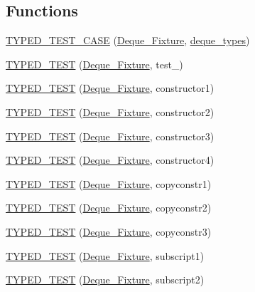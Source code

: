 \subsection*{Functions}
\begin{DoxyCompactItemize}
\item 
\hyperlink{TestDeque_8c_09_09_a79c5f0d583b012a972111954cd22db81}{T\-Y\-P\-E\-D\-\_\-\-T\-E\-S\-T\-\_\-\-C\-A\-S\-E} (\hyperlink{structDeque__Fixture}{Deque\-\_\-\-Fixture}, \hyperlink{TestDeque_8c_09_09_ad1999e4b3126317baa06a1266daa323c}{deque\-\_\-types})
\item 
\hyperlink{TestDeque_8c_09_09_a2729a50d5ca3edae9f1725a4263c7270}{T\-Y\-P\-E\-D\-\_\-\-T\-E\-S\-T} (\hyperlink{structDeque__Fixture}{Deque\-\_\-\-Fixture}, test\-\_)
\item 
\hyperlink{TestDeque_8c_09_09_a26339ed26d7eb2947b2be93dcb24d176}{T\-Y\-P\-E\-D\-\_\-\-T\-E\-S\-T} (\hyperlink{structDeque__Fixture}{Deque\-\_\-\-Fixture}, constructor1)
\item 
\hyperlink{TestDeque_8c_09_09_aa7bd41496de6d96a05b95de28e9dbbc1}{T\-Y\-P\-E\-D\-\_\-\-T\-E\-S\-T} (\hyperlink{structDeque__Fixture}{Deque\-\_\-\-Fixture}, constructor2)
\item 
\hyperlink{TestDeque_8c_09_09_a15aad0122e5f1338270ab7ab89f4c25b}{T\-Y\-P\-E\-D\-\_\-\-T\-E\-S\-T} (\hyperlink{structDeque__Fixture}{Deque\-\_\-\-Fixture}, constructor3)
\item 
\hyperlink{TestDeque_8c_09_09_aecae786b0d773297b0e13281bce87232}{T\-Y\-P\-E\-D\-\_\-\-T\-E\-S\-T} (\hyperlink{structDeque__Fixture}{Deque\-\_\-\-Fixture}, constructor4)
\item 
\hyperlink{TestDeque_8c_09_09_a6e6bc84645a0b2a1bace57c272522667}{T\-Y\-P\-E\-D\-\_\-\-T\-E\-S\-T} (\hyperlink{structDeque__Fixture}{Deque\-\_\-\-Fixture}, copyconstr1)
\item 
\hyperlink{TestDeque_8c_09_09_a26191af0460fe503be8600cc00ea9b0d}{T\-Y\-P\-E\-D\-\_\-\-T\-E\-S\-T} (\hyperlink{structDeque__Fixture}{Deque\-\_\-\-Fixture}, copyconstr2)
\item 
\hyperlink{TestDeque_8c_09_09_ac3c4f0997cd77bfe9fe776df06883cbc}{T\-Y\-P\-E\-D\-\_\-\-T\-E\-S\-T} (\hyperlink{structDeque__Fixture}{Deque\-\_\-\-Fixture}, copyconstr3)
\item 
\hyperlink{TestDeque_8c_09_09_aaa017fb165eb9e7b5433d8cce98fa9b3}{T\-Y\-P\-E\-D\-\_\-\-T\-E\-S\-T} (\hyperlink{structDeque__Fixture}{Deque\-\_\-\-Fixture}, subscript1)
\item 
\hyperlink{TestDeque_8c_09_09_a5dc55b8254cc03c6a6d85b0d919d5ded}{T\-Y\-P\-E\-D\-\_\-\-T\-E\-S\-T} (\hyperlink{structDeque__Fixture}{Deque\-\_\-\-Fixture}, subscript2)

\end{DoxyCompactItemize}
